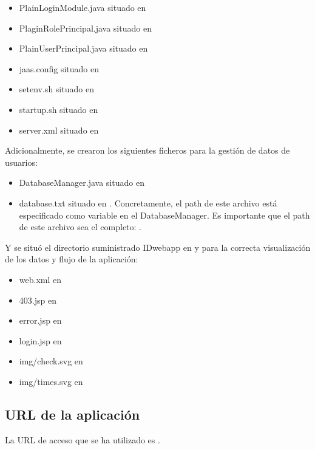 \documentclass[10pt,a4paper]{article}
\begin{document}
\begin{itemize}
\item PlainLoginModule.java situado en 
\item PlaginRolePrincipal.java situado en 
\item PlainUserPrincipal.java situado en 
\item jaas.config situado en 
\item setenv.sh situado en 
\item startup.sh situado en 
\item server.xml situado en 
\end{itemize}
Adicionalmente, se crearon los siguientes ficheros para la gestión de datos de usuarios:
\begin{itemize}
\item DatabaseManager.java situado en 
\item database.txt situado en . Concretamente, el path de este archivo está especificado como variable en el DatabaseManager. Es importante que el path de este archivo sea el completo: .
\end{itemize}

Y se situó el directorio suministrado IDwebapp en  y para la correcta visualización de los datos y flujo de la aplicación:
\begin{itemize}
\item web.xml en 
\item 403.jsp en 
\item error.jsp en 
\item login.jsp en 
\item img/check.svg en 
\item img/times.svg en 
\end{itemize}

\subsection*{URL de la aplicación}
La URL de acceso que se ha utilizado es .
\end{document}
